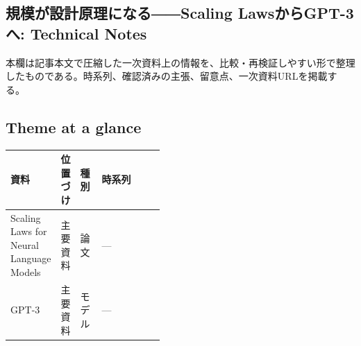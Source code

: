 \subsection*{規模が設計原理になる――Scaling LawsからGPT-3へ: Technical Notes}
本欄は記事本文で圧縮した一次資料上の情報を、比較・再検証しやすい形で整理したものである。時系列、確認済みの主張、留意点、一次資料URLを掲載する。
\medskip
\subsection*{Theme at a glance}
\begin{center}
\footnotesize
\begin{tabularx}{\linewidth}{@{}p{0.20\linewidth}p{0.10\linewidth}p{0.14\linewidth}X@{}}
\toprule
資料 & 位置づけ & 種別 & 時系列 \\
\midrule
Scaling Laws for Neural Language Models & 主要資料 & 論文 & — \\
GPT-3 & 主要資料 & モデル & — \\
\bottomrule
\end{tabularx}
\end{center}
\normalsize

